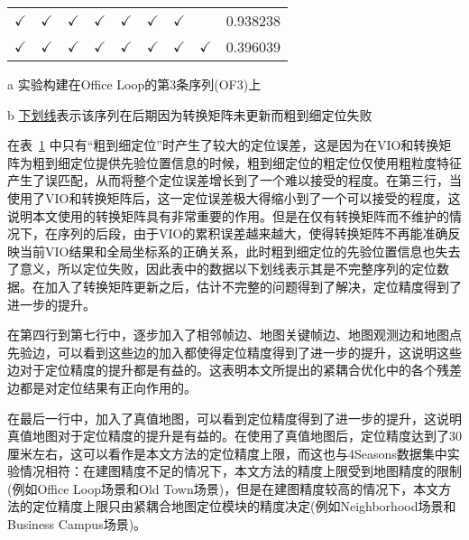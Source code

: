 \begin{table}
\begin{threeparttable}
\begin{tabular}{cccccccc|c}
$\checkmark$ & $\checkmark$                                     &$\checkmark$                                                   & $\checkmark$                                    & $\checkmark$                                      & $\checkmark$                                     & $\checkmark$                                      &                                                 & 0.938238       \\
$\checkmark$ & $\checkmark$                                     &$\checkmark$                                                   & $\checkmark$                                    & $\checkmark$                                      & $\checkmark$                                     & $\checkmark$                                      & $\checkmark$                                    & 0.396039       \\ \bottomrule
\end{tabular}
\label{tab:loc_ablation}
\begin{tablenotes}
  \item [a] 实验构建在Office Loop的第3条序列(OF3)上
  \item [b] \underline{下划线}表示该序列在后期因为转换矩阵未更新而粗到细定位失败
\end{tablenotes}
\end{threeparttable}
\end{table}

在表~\ref{tab:loc_ablation} 中只有“粗到细定位”时产生了较大的定位误差，这是因为在VIO和转换矩阵为粗到细定位提供先验位置信息的时候，粗到细定位的粗定位仅使用粗粒度特征产生了误匹配，从而将整个定位误差增长到了一个难以接受的程度。在第三行，当使用了VIO和转换矩阵后，这一定位误差极大得缩小到了一个可以接受的程度，这说明本文使用的转换矩阵具有非常重要的作用。但是在仅有转换矩阵而不维护的情况下，在序列的后段，由于VIO的累积误差越来越大，使得转换矩阵不再能准确反映当前VIO结果和全局坐标系的正确关系，此时粗到细定位的先验位置信息也失去了意义，所以定位失败，因此表中的数据以下划线表示其是不完整序列的定位数据。在加入了转换矩阵更新之后，估计不完整的问题得到了解决，定位精度得到了进一步的提升。

在第四行到第七行中，逐步加入了相邻帧边、地图关键帧边、地图观测边和地图点先验边，可以看到这些边的加入都使得定位精度得到了进一步的提升，这说明这些边对于定位精度的提升都是有益的。这表明本文所提出的紧耦合优化中的各个残差边都是对定位结果有正向作用的。

在最后一行中，加入了真值地图，可以看到定位精度得到了进一步的提升，这说明真值地图对于定位精度的提升是有益的。在使用了真值地图后，定位精度达到了30厘米左右，这可以看作是本文方法的定位精度上限，而这也与4Seasons数据集中实验情况相符：在建图精度不足的情况下，本文方法的精度上限受到地图精度的限制(例如Office Loop场景和Old Town场景)，但是在建图精度较高的情况下，本文方法的定位精度上限只由紧耦合地图定位模块的精度决定(例如Neighborhood场景和Business Campus场景)。

